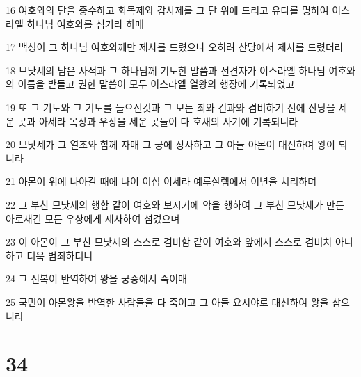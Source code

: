 \par 16 여호와의 단을 중수하고 화목제와 감사제를 그 단 위에 드리고 유다를 명하여 이스라엘 하나님 여호와를 섬기라 하매
\par 17 백성이 그 하나님 여호와께만 제사를 드렸으나 오히려 산당에서 제사를 드렸더라
\par 18 므낫세의 남은 사적과 그 하나님께 기도한 말씀과 선견자가 이스라엘 하나님 여호와의 이름을 받들고 권한 말씀이 모두 이스라엘 열왕의 행장에 기록되었고
\par 19 또 그 기도와 그 기도를 들으신것과 그 모든 죄와 건과와 겸비하기 전에 산당을 세운 곳과 아세라 목상과 우상을 세운 곳들이 다 호새의 사기에 기록되니라
\par 20 므낫세가 그 열조와 함께 자매 그 궁에 장사하고 그 아들 아몬이 대신하여 왕이 되니라
\par 21 아몬이 위에 나아갈 때에 나이 이십 이세라 예루살렘에서 이년을 치리하며
\par 22 그 부친 므낫세의 행함 같이 여호와 보시기에 악을 행하여 그 부친 므낫세가 만든 아로새긴 모든 우상에게 제사하여 섬겼으며
\par 23 이 아몬이 그 부친 므낫세의 스스로 겸비함 같이 여호와 앞에서 스스로 겸비치 아니하고 더욱 범죄하더니
\par 24 그 신복이 반역하여 왕을 궁중에서 죽이매
\par 25 국민이 아몬왕을 반역한 사람들을 다 죽이고 그 아들 요시야로 대신하여 왕을 삼으니라

\chapter{34}

